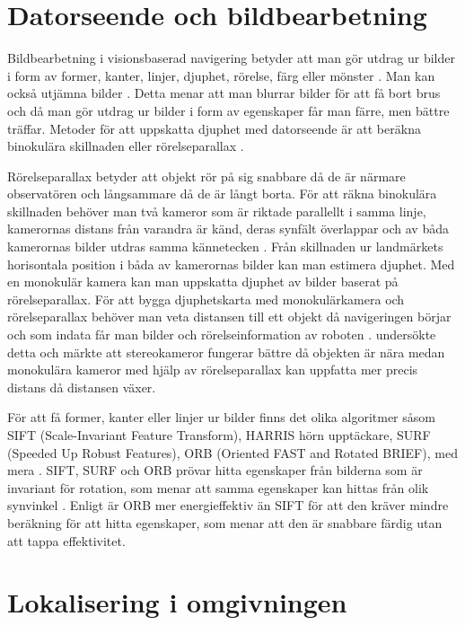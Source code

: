 \section{Datorseende och bildbearbetning}

Bildbearbetning i visionsbaserad navigering betyder att man gör utdrag ur bilder i form av former, kanter, linjer, djuphet, rörelse, färg eller mönster \citep{982903}. Man kan också utjämna bilder \citep{mapbuildingsift}. Detta menar att man blurrar bilder för att få bort brus och då man gör utdrag ur bilder i form av egenskaper får man färre, men bättre träffar. Metoder för att uppskatta djuphet med datorseende är att beräkna binokulära skillnaden eller rörelseparallax \citep{suomimainittu}. 

Rörelseparallax betyder att objekt rör på sig snabbare då de är närmare observatören och långsammare då de är långt borta. För att räkna binokulära skillnaden behöver man två kameror som är riktade parallellt i samma linje, kamerornas distans från varandra är känd, deras synfält överlappar och av båda kamerornas bilder utdras samma kännetecken \citep{suomimainittu}. Från skillnaden ur landmärkets horisontala position i båda av kamerornas bilder kan man estimera djuphet. Med en monokulär kamera kan man uppskatta djuphet av bilder baserat på rörelseparallax. För att bygga djuphetskarta med monokulärkamera och rörelseparallax behöver man veta distansen till ett objekt då navigeringen börjar och som indata får man bilder och rörelseinformation av roboten \citep{suomimainittu}. \cite{suomimainittu} undersökte detta och märkte att stereokameror fungerar bättre då objekten är nära medan monokulära kameror med hjälp av rörelseparallax kan uppfatta mer precis distans då distansen växer. 

För att få former, kanter eller linjer ur bilder finns det olika algoritmer såsom SIFT (Scale-Invariant Feature Transform), HARRIS hörn upptäckare, SURF (Speeded Up Robust Features), ORB (Oriented FAST and Rotated BRIEF), med mera \citep{orb, slamproblem, mapbuildingsift}. SIFT, SURF och ORB prövar hitta egenskaper från bilderna som är invariant för rotation, som menar att samma egenskaper kan hittas från olik synvinkel \citep{orb}. Enligt \cite{orb} är ORB mer energieffektiv än SIFT för att den kräver mindre beräkning för att hitta egenskaper, som menar att den är snabbare färdig utan att tappa effektivitet.

\section{Lokalisering i omgivningen}

